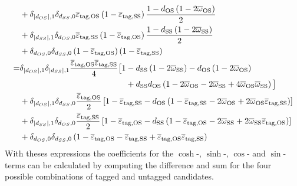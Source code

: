 \begin{align*}
        &+\delta_{\left|d_{OS}\right|,1}\delta_{d_{SS},0}\overline{\varepsilon}_\text{tag,OS}\left(1-\overline{\varepsilon}_\text{tag,SS}\right)
            \frac{1-d_\text{OS}\left(1-2\overline{\omega}_\text{OS}\right)}{2}\\
        &+\delta_{\left|d_{SS}\right|,1}\delta_{d_{OS},0}\overline{\varepsilon}_\text{tag,SS}\left(1-\overline{\varepsilon}_\text{tag,OS}\right)
            \frac{1-d_\text{SS}\left(1-2\overline{\omega}_\text{SS}\right)}{2}\\
        &+\delta_{d_{OS},0}\delta_{d_{SS},0}\left(1-\overline{\varepsilon}_\text{tag,OS}\right)\left(1-\overline{\varepsilon}_\text{tag,SS}\right)\\
    =&\delta_{\left|d_{OS}\right|,1}\delta_{\left|d_{SS}\right|,1}\frac{\overline{\varepsilon}_\text{tag,OS}\overline{\varepsilon}_\text{tag,SS}}{4}
        \big[1-d_\text{SS}\left(1-2\overline{\omega}_\text{SS}\right)-d_\text{OS}\left(1-2\overline{\omega}_\text{OS}\right)\\
    &\hphantom{\delta_{\left|d_{OS}\right|,1}\delta_{\left|d_{SS}\right|,1}\frac{\overline{\varepsilon}_\text{tag,OS}
        \overline{\varepsilon}_\text{tag,SS}}{4}\big[1}+d_\text{SS}d_\text{OS}\left(1-2\overline{\omega}_\text{OS}-2\overline{\omega}_\text{SS}
        +4\overline{\omega}_\text{OS}\overline{\omega}_\text{SS}\right)\big]\\
    &+\delta_{\left|d_{OS}\right|,1}\delta_{d_{SS},0}\frac{\overline{\varepsilon}_\text{tag,OS}}{2}\left[1-\overline{\varepsilon}_\text{tag,SS}-d_\text{OS}
        \left(1-\overline{\varepsilon}_\text{tag,SS}-2\overline{\omega}_\text{OS}
        +2\overline{\omega}_\text{OS}\overline{\varepsilon}_\text{tag,SS}\right)\right]\\
    &+\delta_{\left|d_{SS}\right|,1}\delta_{d_{OS},0}\frac{\overline{\varepsilon}_\text{tag,SS}}{2}\left[1-\overline{\varepsilon}_\text{tag,OS}-d_\text{SS}
        \left(1-\overline{\varepsilon}_\text{tag,OS}-2\overline{\omega}_\text{SS}
        +2\overline{\omega}_\text{SS}\overline{\varepsilon}_\text{tag,OS}\right)\right]\\
    &+\delta_{d_{OS},0}\delta_{d_{SS},0}\left(1-\overline{\varepsilon}_\text{tag,OS}-\overline{\varepsilon}_\text{tag,SS}
        +\overline{\varepsilon}_\text{tag,OS}\overline{\varepsilon}_\text{tag,SS}\right)
\end{align*}
With theses expressions the coefficients for the $\cosh$-, $\sinh$-, $\cos$- and $\sin$-terms can be calculated by computing the difference and sum for the
four possible combinations of tagged and untagged candidates.
